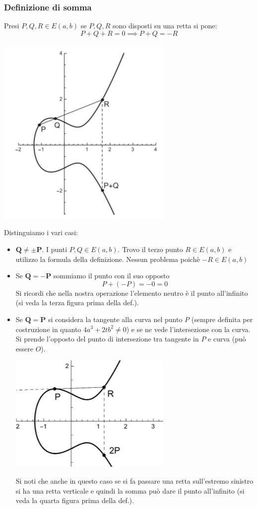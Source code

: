 \subsubsection{Definizione di somma} Presi $P, Q, R \in E(a,b)$ se $P, Q, R$ sono disposti su una retta si pone:
$$ P + Q + R = 0 \implies P + Q = -R $$
\begin{center}
	\includegraphics[scale=.8]{images/28.png}
\end{center}
Distinguiamo i vari casi:
\begin{itemize}
	\item $\mathbf{Q \neq \pm P}$. I punti $P, Q \in E(a,b)$. Trovo il terzo punto $R \in E(a,b)$ e utilizzo la formula della definizione. Nessun problema poichè $-R \in E(a,b)$
	\item Se $\mathbf{Q=-P}$ sommiamo il punto con il suo opposto
	$$P+(-P)=-0=0$$
	Si ricordi che nella nostra operazione l'elemento neutro è il punto all'infinito (si veda la terza figura prima della def.). 
	\item Se $\mathbf{Q = P}$ si considera la tangente alla curva nel punto $P$ (sempre definita per costruzione in quanto $4a^3+2tb^2 \neq 0$) e se ne vede l'intersezione con la curva. Si prende l'opposto del punto di intersezione tra tangente in $P$ e curva (può essere $O$).
	\begin{center}
		\includegraphics[scale=.85]{images/29.png}
	\end{center}
	Si noti che anche in questo caso se si fa passare una retta sull'estremo sinistro si ha una retta verticale e quindi la somma può dare il punto all'infinito (si veda la quarta figura prima della def.).
\end{itemize}

